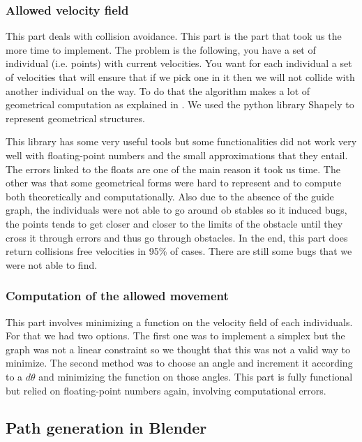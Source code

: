\subsubsection{Allowed velocity field}

This part deals with collision avoidance. This part is the part that took us the more time to implement. The problem is the following, you have a set of individual (i.e. points) with current velocities. You want for each individual a set of velocities that will ensure that  if we pick one in it then we will not collide with another individual on the way. To do that the algorithm makes a lot of geometrical computation as explained in \cite{vandenBerg2011}. We used the python library Shapely to represent geometrical structures. 

This library has some very useful tools but some functionalities did not work very well with floating-point numbers and the small approximations that they entail. The errors linked to the floats are one of the main reason it took us time. %
The other was that some geometrical forms were hard to represent and to compute both theoretically and computationally.
Also due to the absence of the guide graph, the individuals were not able to go around ob stables so it induced bugs, the points tends to get closer and closer to the limits of the obstacle until they cross it through errors and thus go through obstacles.
In the end, this part does return collisions free velocities in 95\% of cases. There are still some bugs that we were not able to find.

\subsubsection{Computation of the allowed movement}

This part involves minimizing a function on the velocity field of each individuals. For that we had two options. The first one was to implement a simplex but the graph was not a linear constraint so we thought that this was not a valid way to minimize.
 The second method was to choose an angle and increment it according to a $d\theta$ and minimizing the function on those angles.
This part is fully functional but relied on floating-point numbers again, involving computational errors.

\subsection{Path generation in Blender}

